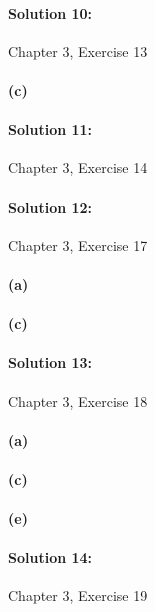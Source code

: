 \documentclass[a4paper]{article}
\begin{document}
\paragraph{Solution 10:}
Chapter 3, Exercise 13

\paragraph{(c)}

\paragraph{Solution 11:}
Chapter 3, Exercise 14

\paragraph{Solution 12:}
Chapter 3, Exercise 17

\paragraph{(a)}

\paragraph{(c)}

\paragraph{Solution 13:}
Chapter 3, Exercise 18

\paragraph{(a)}

\paragraph{(c)}

\paragraph{(e)}

\paragraph{Solution 14:}
Chapter 3, Exercise 19
\end{document}
